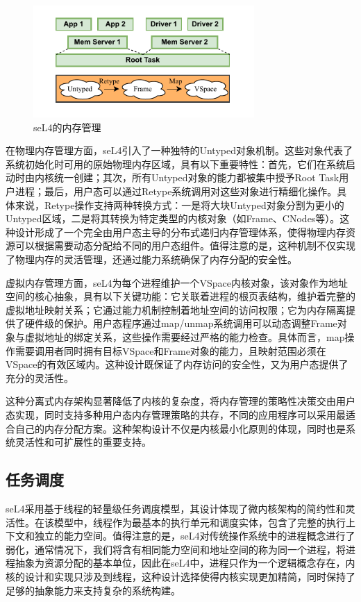 \begin{figure}[htbp]
  \centering
  \includegraphics[width=0.75\textwidth]{figures/seL4_mm.drawio.pdf}
  \caption{seL4的内存管理}\label{fig:seL4_mm}
\end{figure}

在物理内存管理方面，seL4引入了一种独特的Untyped对象机制。这些对象代表了系统初始化时可用的原始物理内存区域，具有以下重要特性：首先，它们在系统启动时由内核统一创建；其次，所有Untyped对象的能力都被集中授予Root Task用户进程；最后，用户态可以通过Retype系统调用对这些对象进行精细化操作。具体来说，Retype操作支持两种转换方式：一是将大块Untyped对象分割为更小的Untyped区域，二是将其转换为特定类型的内核对象（如Frame、CNodes等）。这种设计形成了一个完全由用户态主导的分布式递归内存管理体系，使得物理内存资源可以根据需要动态分配给不同的用户态组件。值得注意的是，这种机制不仅实现了物理内存的灵活管理，还通过能力系统确保了内存分配的安全性。

虚拟内存管理方面，seL4为每个进程维护一个VSpace内核对象，该对象作为地址空间的核心抽象，具有以下关键功能：它关联着进程的根页表结构，维护着完整的虚拟地址映射关系；它通过能力机制控制着地址空间的访问权限；它为内存隔离提供了硬件级的保护。用户态程序通过map/unmap系统调用可以动态调整Frame对象与虚拟地址的绑定关系，这些操作需要经过严格的能力检查。具体而言，map操作需要调用者同时拥有目标VSpace和Frame对象的能力，且映射范围必须在VSpace的有效区域内。这种设计既保证了内存访问的安全性，又为用户态提供了充分的灵活性。

这种分离式内存架构显著降低了内核的复杂度，将内存管理的策略性决策交由用户态实现，同时支持多种用户态内存管理策略的共存，不同的应用程序可以采用最适合自己的内存分配方案。这种架构设计不仅是内核最小化原则的体现，同时也是系统灵活性和可扩展性的重要支持。


\subsection{任务调度}
\label{sec:sel4_task}

seL4采用基于线程的轻量级任务调度模型，其设计体现了微内核架构的简约性和灵活性。在该模型中，线程作为最基本的执行单元和调度实体，包含了完整的执行上下文和独立的能力空间。值得注意的是，seL4对传统操作系统中的进程概念进行了弱化，通常情况下，我们将含有相同能力空间和地址空间的称为同一个进程，将进程抽象为资源分配的基本单位，因此在seL4中，进程只作为一个逻辑概念存在，内核的设计和实现只涉及到线程，这种设计选择使得内核实现更加精简，同时保持了足够的抽象能力来支持复杂的系统构建。


